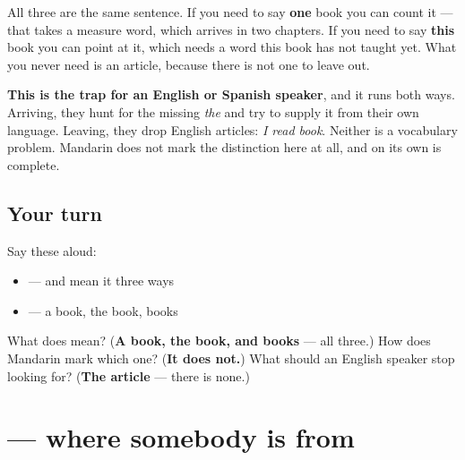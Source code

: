 All three are the same sentence. If you need to say \textbf{one} book you can count it — that takes a measure word, which arrives in two chapters. If you need to say \textbf{this} book you can point at it, which needs a word this book has not taught yet. What you never need is an article, because there is not one to leave out.

\textbf{This is the trap for an English or Spanish speaker}, and it runs both ways. Arriving, they hunt for the missing \emph{the} and try to supply it from their own language. Leaving, they drop English articles: \emph{I read book}. Neither is a vocabulary problem. Mandarin does not mark the distinction here at all, and  on its own is complete.

\subsection*{Your turn}
Say these aloud:

\begin{itemize}
\raggedright
  \item {} — and mean it three ways
  \item {} — a book, the book, books
\end{itemize}

\begin{tcolorbox}[breakable,colback=teal!4,colframe=teal!35!black,title={Before you move on}]
What does  mean? (\textbf{A book, the book, and books} — all three.) How does Mandarin mark which one? (\textbf{It does not.}) What should an English speaker stop looking for? (\textbf{The article} — there is none.)
\end{tcolorbox}
\section[\texorpdfstring{\zh{中国人} (Zhōngguó rén)}{中国人 (Zhōngguó rén)}]{ — where somebody is from}

\label{lesson:ZH-C22-zhongguoren}




